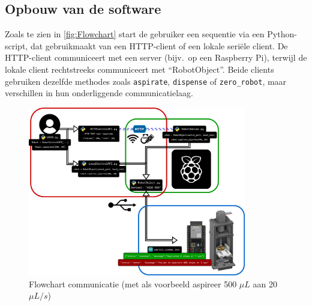 \subsection{Opbouw van de software}

Zoals te zien in \autoref{fig:Flowchart} start de gebruiker een sequentie via een Python-script, dat gebruikmaakt van een HTTP-client of een lokale seriële client. De HTTP-client communiceert met een server (bijv.\ op een Raspberry Pi), terwijl de lokale client rechtstreeks communiceert met ``RobotObject''. Beide clients gebruiken dezelfde methodes zoals \texttt{aspirate}, \texttt{dispense} of \texttt{zero\_robot}, maar verschillen in hun onderliggende communicatielaag.
\\[12pt]\begin{figure}[H]
    \centering
    \includegraphics[width=0.85\textwidth]{figures/Flowchart.png}
    \caption{Flowchart communicatie (met als voorbeeld aspireer 500 $\mu L$ aan 20 $\mu L/s$)}\label{fig:Flowchart}
\end{figure}

